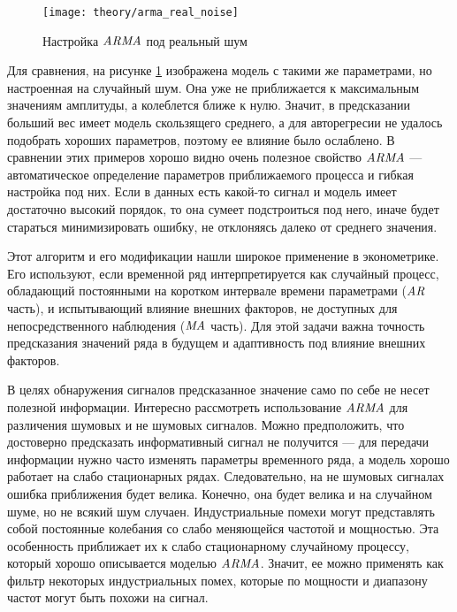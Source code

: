 \begin{figure}[h]
  \centering
  \texttt{[image: theory/arma\_real\_noise]}
  \caption{Настройка $\mathit{ARMA}$ под реальный шум}
  \label{fig:theory:arma_real_noise}
\end{figure}

Для сравнения, на рисунке \ref{fig:theory:arma_real_noise} изображена модель с такими же параметрами, но настроенная на случайный шум. Она уже не приближается к максимальным значениям амплитуды, а колеблется ближе к нулю. Значит, в предсказании больший вес имеет модель скользящего среднего, а для авторегресии не удалось подобрать хороших параметров, поэтому ее влияние было ослаблено. В сравнении этих примеров хорошо видно очень полезное свойство $\mathit{ARMA}$ --- автоматическое определение параметров приближаемого процесса и гибкая настройка под них. Если в данных есть какой-то сигнал и модель имеет достаточно высокий порядок, то она сумеет подстроиться под него, иначе будет стараться минимизировать ошибку, не отклоняясь далеко от среднего значения.

Этот алгоритм и его модификации нашли широкое применение в эконометрике. Его используют, если временной ряд интерпретируется как случайный процесс, обладающий постоянными на коротком интервале времени параметрами ($\mathit{AR}$ часть), и испытывающий влияние внешних факторов, не доступных для непосредственного наблюдения ($\mathit{MA}$ часть). Для этой задачи важна точность предсказания значений ряда в будущем и адаптивность под влияние внешних факторов.

В целях обнаружения сигналов предсказанное значение само по себе не несет полезной информации. Интересно рассмотреть использование $\mathit{ARMA}$ для различения шумовых и не шумовых сигналов. Можно предположить, что достоверно предсказать информативный сигнал не получится --- для передачи информации нужно часто изменять параметры временного ряда, а модель хорошо работает на слабо стационарных рядах. Следовательно, на не шумовых сигналах ошибка приближения будет велика. Конечно, она будет велика и на случайном шуме, но не всякий шум случаен. Индустриальные помехи могут представлять собой постоянные колебания со слабо меняющейся частотой и мощностью. Эта особенность приближает их к слабо стационарному случайному процессу, который хорошо описывается моделью $\mathit{ARMA}$. Значит, ее можно применять как фильтр некоторых индустриальных помех, которые по мощности и диапазону частот могут быть похожи на сигнал.

